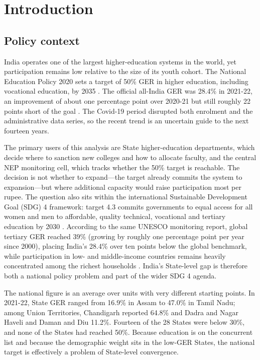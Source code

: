 \section{Introduction}

\subsection{Policy context}

India operates one of the largest higher-education systems in the world, yet participation remains low relative to the size of its youth cohort. The National Education Policy 2020 sets a target of 50\% GER in higher education, including vocational education, by 2035 \cite{nep2020}. The official all-India GER was 28.4\% in 2021-22, an improvement of about one percentage point over 2020-21 but still roughly 22 points short of the goal \cite{aishe2023,ogd2025}. The Covid-19 period disrupted both enrolment and the administrative data series, so the recent trend is an uncertain guide to the next fourteen years.

The primary users of this analysis are State higher-education departments, which decide where to sanction new colleges and how to allocate faculty, and the central NEP monitoring cell, which tracks whether the 50\% target is reachable. The decision is not whether to expand---the target already commits the system to expansion---but where additional capacity would raise participation most per rupee. The question also sits within the international Sustainable Development Goal (SDG) 4 framework: target 4.3 commits governments to equal access for all women and men to affordable, quality technical, vocational and tertiary education by 2030 \cite{unesco2020}. According to the same UNESCO monitoring report, global tertiary GER reached 39\% (growing by roughly one percentage point per year since 2000), placing India's 28.4\% over ten points below the global benchmark, while participation in low- and middle-income countries remains heavily concentrated among the richest households \cite{unesco2020}. India's State-level gap is therefore both a national policy problem and part of the wider SDG 4 agenda.

The national figure is an average over units with very different starting points. In 2021-22, State GER ranged from 16.9\% in Assam to 47.0\% in Tamil Nadu; among Union Territories, Chandigarh reported 64.8\% and Dadra and Nagar Haveli and Daman and Diu 11.2\%. Fourteen of the 28 States were below 30\%, and none of the States had reached 50\%. Because education is on the concurrent list and because the demographic weight sits in the low-GER States, the national target is effectively a problem of State-level convergence.

